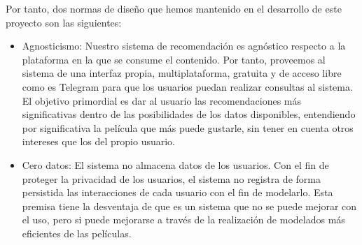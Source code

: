 Por tanto, dos normas de diseño que hemos mantenido en el desarrollo de este proyecto son las siguientes:

\begin{itemize}
    \item Agnosticismo: Nuestro sistema de recomendación es agnóstico respecto a la plataforma en la que se consume el contenido. Por tanto, proveemos al sistema de una interfaz propia, multiplataforma, gratuita y de acceso libre como es Telegram para que los usuarios puedan realizar consultas al sistema. El objetivo primordial es dar al usuario las recomendaciones más significativas dentro de las posibilidades de los datos disponibles, entendiendo por significativa la película que más puede gustarle, sin tener en cuenta otros intereses que los del propio usuario.
    \item Cero datos: El sistema no almacena datos de los usuarios. Con el fin de proteger la privacidad de los usuarios, el sistema no registra de forma persistida las interacciones de cada usuario con el fin de modelarlo. Esta premisa tiene la desventaja de que es un sistema que no se puede mejorar con el uso, pero si puede mejorarse a través de la realización de modelados más eficientes de las películas.
\end{itemize}



